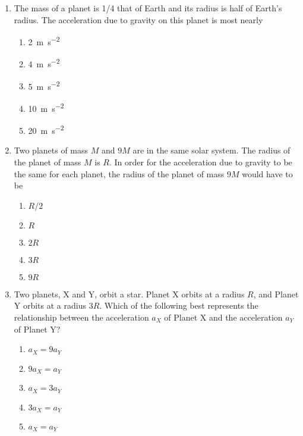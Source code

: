 \documentclass{../../../oss-apphys}
\begin{document}
\begin{multicols}{2}
\begin{enumerate}[leftmargin=18pt,resume]
  \item The mass of a planet is 1/4 that of Earth and its radius is half of
    Earth's radius. The acceleration due to gravity on this planet is most
    nearly
    \begin{enumerate}[nosep,leftmargin=18pt,label=(\Alph*)]
    \item\SI{2}{\metre\per\second\squared}
    \item\SI{4}{\metre\per\second\squared}
    \item\SI{5}{\metre\per\second\squared}
    \item\SI{10}{\metre\per\second\squared}
    \item\SI{20}{\metre\per\second\squared}
    \end{enumerate}
  
  \item Two planets of mass $M$ and $9M$ are in the same solar system. The
    radius of the planet of mass $M$ is $R$. In order for the acceleration due
    to gravity to be the same for each planet, the radius of the planet of mass
    $9M$ would have to be
    \begin{enumerate}[nosep,leftmargin=18pt,label=(\Alph*)]
    \item $R/2$
    \item $R$
    \item $2R$
    \item $3R$
    \item $9R$
    \end{enumerate}
    
  \item Two planets, X and Y, orbit a star. Planet X orbits at a radius $R$, and
    Planet Y orbits at a radius $3R$. Which of the following best represents
    the relationship between the acceleration $a_X$ of Planet X and the
    acceleration $a_Y$ of Planet Y?
    \begin{center}
    \end{center}
    \begin{enumerate}[nosep,leftmargin=18pt,label=(\Alph*)]
    \item $a_X = 9a_Y$
    \item $9a_X = a_Y$
    \item $a_X = 3a_Y$
    \item $3a_X = a_Y$
    \item $a_X = a_Y$
    \end{enumerate}
    

\end{enumerate}
\end{multicols}
\end{document}
